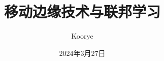 \documentclass{article}
\title{移动边缘技术与联邦学习}
\author{Koorye}
\date{2024年3月27日}
\begin{document}
\begin{titlepage}
\maketitle
\end{titlepage}

\tableofcontents
\newpage









\newpage


\end{document}

